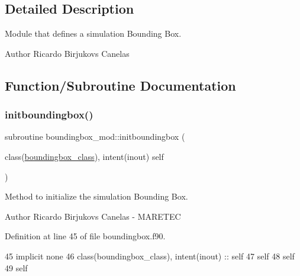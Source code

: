 \subsection{Detailed Description}
Module that defines a simulation Bounding Box. 

\begin{DoxyAuthor}{Author}
Ricardo Birjukovs Canelas 
\end{DoxyAuthor}


\subsection{Function/\+Subroutine Documentation}
\mbox{\label{namespaceboundingbox__mod_a35e41bb92c19802441dd8d748c3acfb4}} 
\subsubsection{\texorpdfstring{initboundingbox()}{initboundingbox()}}
{\footnotesize\ttfamily subroutine boundingbox\+\_\+mod\+::initboundingbox (\begin{DoxyParamCaption}\item[{class(\mbox{\hyperlink{structboundingbox__mod_1_1boundingbox__class}{boundingbox\+\_\+class}}), intent(inout)}]{self }\end{DoxyParamCaption})\hspace{0.3cm}{\ttfamily [private]}}



Method to initialize the simulation Bounding Box. 

\begin{DoxyAuthor}{Author}
Ricardo Birjukovs Canelas -\/ M\+A\+R\+E\+T\+EC 
\end{DoxyAuthor}


Definition at line 45 of file boundingbox.\+f90.


\begin{DoxyCode}
45     \textcolor{keywordtype}{implicit none}
46     \textcolor{keywordtype}{class}(boundingbox\_class), \textcolor{keywordtype}{intent(inout)} :: self
47     self%
48     self%
49     self%
\end{DoxyCode}
\mbox{\label{namespaceboundingbox__mod_a6ec461b758bc180dc72b5fb23169feca}} 

